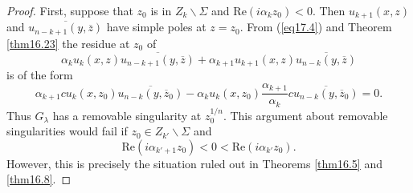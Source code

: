 \documentclass{surv-l}
\theoremstyle{plain}
\theoremstyle{definition}
\numberwithin{equation}{chapter}
\begin{document}
\begin{proof}  First,  suppose  that $z_{0}$ is in $ Z_{k}\backslash \Sigma$ and $\mathrm{Re}(i\alpha_{k}z_{0})<0$. Then $u_{k+1}(x,z)$ and $\overline{u_{n-k+1}(y,\overline{z})}$ have simple poles at $z=z_{0}$. From (\ref{eq17.4}) and Theorem \ref{thm16.23} the residue at $z_{0}$ of
\begin{equation}\label{eq17.9}
\alpha_{k}u_{k}(x,z)\overline{u_{n-k+1}(y,\overline{z})}+\alpha_{k+1}u_{k+1}(x,z)\overline{u_{n-k}(y,\overline{z})}
\end{equation}
is of the form
\begin{equation}\label{eq17.10}
\alpha_{k+1}cu_{k}(x, z_{0})\overline{u_{n-k}(y,\overline{z}_{0})}-\alpha_{k}u_{k}(x,z_{0})\frac{\alpha_{k+1}}{\alpha_{k}}c\overline{u_{n-k}(y,\overline{z}_{0})}=0.
\end{equation}
Thus $G_{\lambda}$ has a removable singularity at $z_{0}^{1/n}$. This argument about removable singularities would fail if $ z_{0}\in Z_{k'}\backslash \Sigma$ and
\begin{equation*}
\mathrm{Re}(i\alpha_{k'+1}z_{0})<0<\mathrm{Re}(i\alpha_{k'}z_{0}).
\end{equation*}
However, this is precisely the situation ruled out in Theorems \ref{thm16.5} and \ref{thm16.8}.


\end{proof}
\end{document}

